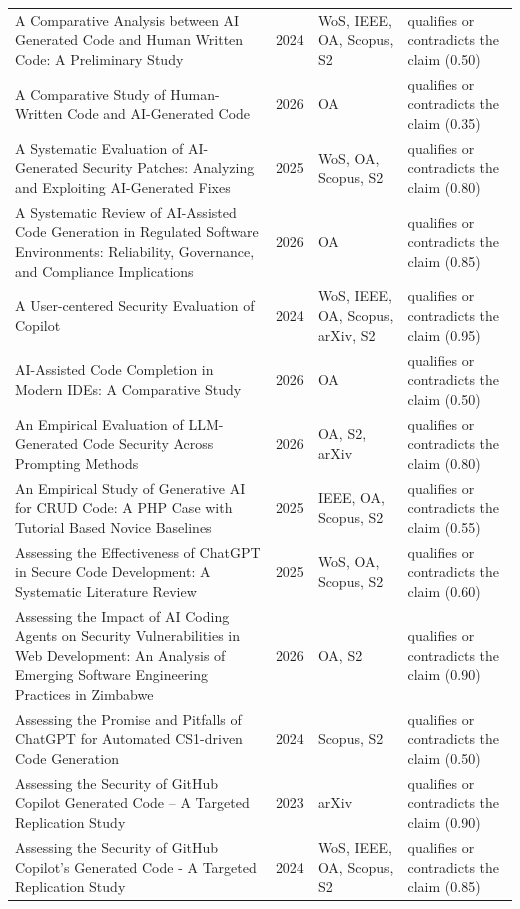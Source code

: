 \begin{longtable}{@{}%
  >{\raggedright\arraybackslash}p{}c%
  >{\raggedright\arraybackslash}p{}%
  >{\raggedright\arraybackslash}p{}@{}}
A Comparative Analysis between AI Generated Code and Human Written Code: A Preliminary Study & 2024 & WoS, IEEE, OA, Scopus, S2 & qualifies or contradicts the claim (0.50) \\
A Comparative Study of Human-Written Code and AI-Generated Code & 2026 & OA & qualifies or contradicts the claim (0.35) \\
A Systematic Evaluation of AI-Generated Security Patches: Analyzing and Exploiting AI-Generated Fixes & 2025 & WoS, OA, Scopus, S2 & qualifies or contradicts the claim (0.80) \\
A Systematic Review of AI-Assisted Code Generation in Regulated Software Environments: Reliability, Governance, and Compliance Implications & 2026 & OA & qualifies or contradicts the claim (0.85) \\
A User-centered Security Evaluation of Copilot & 2024 & WoS, IEEE, OA, Scopus, arXiv, S2 & qualifies or contradicts the claim (0.95) \\
AI-Assisted Code Completion in Modern IDEs: A Comparative Study & 2026 & OA & qualifies or contradicts the claim (0.50) \\
An Empirical Evaluation of LLM-Generated Code Security Across Prompting Methods & 2026 & OA, S2, arXiv & qualifies or contradicts the claim (0.80) \\
An Empirical Study of Generative AI for CRUD Code: A PHP Case with Tutorial Based Novice Baselines & 2025 & IEEE, OA, Scopus, S2 & qualifies or contradicts the claim (0.55) \\
Assessing the Effectiveness of ChatGPT in Secure Code Development: A Systematic Literature Review & 2025 & WoS, OA, Scopus, S2 & qualifies or contradicts the claim (0.60) \\
Assessing the Impact of AI Coding Agents on Security Vulnerabilities in Web Development: An Analysis of Emerging Software Engineering Practices in Zimbabwe & 2026 & OA, S2 & qualifies or contradicts the claim (0.90) \\
Assessing the Promise and Pitfalls of ChatGPT for Automated CS1-driven Code Generation & 2024 & Scopus, S2 & qualifies or contradicts the claim (0.50) \\
Assessing the Security of GitHub Copilot Generated Code -- A Targeted Replication Study & 2023 & arXiv & qualifies or contradicts the claim (0.90) \\
Assessing the Security of GitHub Copilot's Generated Code - A Targeted Replication Study & 2024 & WoS, IEEE, OA, Scopus, S2 & qualifies or contradicts the claim (0.85) \\

\end{longtable}
